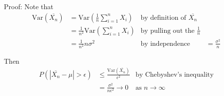 \documentclass[a4paper,10pt]{article}
\newcommand{\Var}{\mathrm{Var}}
\begin{document}
Proof: Note that
\begin{align*}
    \Var(\overline{X_n}) &= \Var(\frac{1}{n}\sum_{i=1}^{n}X_i) &\text{by definition of $\overline{X_n}$} \\
    &= \frac{1}{n^2}\Var(\sum_{i=1}^{n}X_i) &\text{by pulling out the $\frac{1}{n}$} \\
    &= \frac{1}{n^2}n\sigma^2 &\text{by independence}
    &= \frac{\sigma^2}{n}
\end{align*}

Then 
\begin{align*}
    P(|\overline{X_n} - \mu| > \epsilon) &\leq \frac{\Var(\overline{X_n})}{\epsilon^2} &\text{by Chebyshev's inequality} \\
    &= \frac{\sigma^2}{n\epsilon^2} \to 0 &\text{as $n \to \infty$}
\end{align*}
\end{document}
